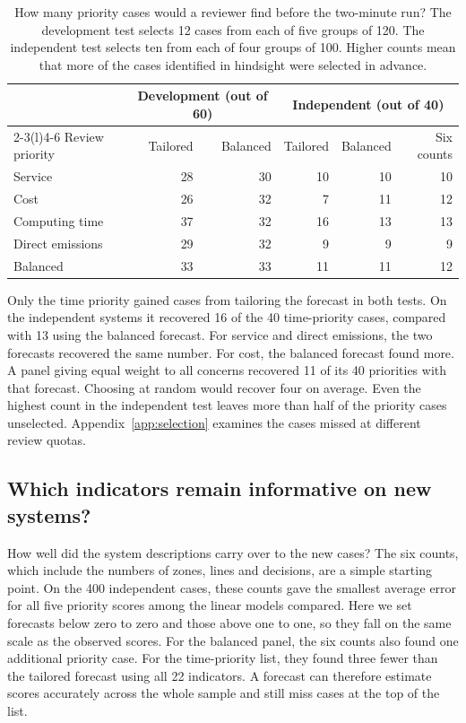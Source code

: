 \documentclass[11pt,a4paper]{article}
\newcommand{\tablefont}{\small\renewcommand{\arraystretch}{1.14}}
\begin{document}
\begin{table}[!htb]\centering\tablefont
\caption{How many priority cases would a reviewer find before the two-minute run? The development test selects 12 cases from each of five groups of 120. The independent test selects ten from each of four groups of 100. Higher counts mean that more of the cases identified in hindsight were selected in advance.}
\label{tab:review}
\begin{tabular}{@{}lrr rrr@{}}\toprule
& \multicolumn{2}{c}{Development (out of 60)} & \multicolumn{3}{c}{Independent (out of 40)}\\
\cmidrule(lr){2-3}\cmidrule(l){4-6}
Review priority & Tailored & Balanced & Tailored & Balanced & Six counts\\\midrule
Service & 28 & 30 & 10 & 10 & 10\\
Cost & 26 & 32 & 7 & 11 & 12\\
Computing time & 37 & 32 & 16 & 13 & 13\\
Direct emissions & 29 & 32 & 9 & 9 & 9\\
Balanced & 33 & 33 & 11 & 11 & 12\\
\bottomrule\end{tabular}
\end{table}

Only the time priority gained cases from tailoring the forecast in both tests. On the independent systems it recovered 16 of the 40 time-priority cases, compared with 13 using the balanced forecast. For service and direct emissions, the two forecasts recovered the same number. For cost, the balanced forecast found more. A panel giving equal weight to all concerns recovered 11 of its 40 priorities with that forecast. Choosing at random would recover four on average. Even the highest count in the independent test leaves more than half of the priority cases unselected. Appendix~\ref{app:selection} examines the cases missed at different review quotas.

\subsection{Which indicators remain informative on new systems?}
\label{sec:final_independent_descriptors}

How well did the system descriptions carry over to the new cases? The six counts, which include the numbers of zones, lines and decisions, are a simple starting point. On the 400 independent cases, these counts gave the smallest average error for all five priority scores among the linear models compared. Here we set forecasts below zero to zero and those above one to one, so they fall on the same scale as the observed scores. For the balanced panel, the six counts also found one additional priority case. For the time-priority list, they found three fewer than the tailored forecast using all 22 indicators. A forecast can therefore estimate scores accurately across the whole sample and still miss cases at the top of the list.
\end{document}
